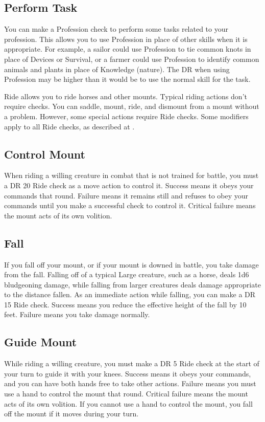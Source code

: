     \subsection{Perform Task}
        You can make a Profession check to perform some tasks related to your profession. This allows you to use Profession in place of other skills when it is appropriate. For example, a sailor could use Profession to tie common knots in place of Devices or Survival, or a farmer could use Profession to identify common animals and plants in place of Knowledge (nature). The DR when using Profession may be higher than it would be to use the normal skill for the task.

        Ride allows you to ride horses and other mounts. Typical riding actions don't require checks. You can saddle, mount, ride, and dismount from a mount without a problem. However, some special actions require Ride checks. Some modifiers apply to all Ride checks, as described at .

    \subsection{Control Mount}
        When riding a willing creature in combat that is not trained for battle, you must a DR 20 Ride check as a move action to control it. Success means it obeys your commands that round. Failure means it remains still and refuses to obey your commands until you make a successful check to control it. Critical failure means the mount acts of its own volition.

    \subsection{Fall}
        If you fall off your mount, or if your mount is downed in battle, you take damage from the fall. Falling off of a typical Large creature, such as a horse, deals 1d6 bludgeoning damage, while falling from larger creatures deals damage appropriate to the distance fallen. As an immediate action while falling, you can make a DR 15 Ride check. Success means you reduce the effective height of the fall by 10 feet. Failure means you take damage normally.

    \subsection{Guide Mount}
        While riding a willing creature, you must make a DR 5 Ride check at the start of your turn to guide it with your knees. Success means it obeys your commands, and you can have both hands free to take other actions. Failure means you must use a hand to control the mount that round. Critical failure means the mount acts of its own volition. If you cannot use a hand to control the mount, you fall off the mount if it moves during your turn.

